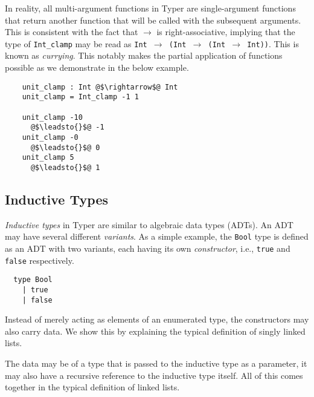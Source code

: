 \documentclass[12pt,twoside,maitrise]{dms}
\theoremstyle{definition}
\numberwithin{equation}{section}
\numberwithin{table}{chapter}
\numberwithin{figure}{chapter}
\newcommand\id[1] {\texttt{#1}}
\begin{document}
In reality, all multi-argument functions in Typer are single-argument functions
that return another function that will be called with the subsequent arguments.
This is consistent with the fact that \id{$\rightarrow$} is right-associative,
implying that the type of \id{Int_clamp} may be read as \id{Int $\rightarrow$
(Int $\rightarrow$ (Int $\rightarrow$ Int))}. This is known as \emph{currying}.
This notably makes the partial application of functions possible as we
demonstrate in the below example.

\begin{verbatim}
    unit_clamp : Int @$\rightarrow$@ Int
    unit_clamp = Int_clamp -1 1

    unit_clamp -10
      @$\leadsto{}$@ -1
    unit_clamp -0
      @$\leadsto{}$@ 0
    unit_clamp 5
      @$\leadsto{}$@ 1
\end{verbatim}

\subsection{Inductive Types}\label{subsec:intro-ind-types}


\emph{Inductive types} in Typer are similar to algebraic data types (ADTs). An
ADT may have several different \emph{variants}. As a simple example, the
\id{Bool} type is defined as an ADT with two variants, each having its own
\emph{constructor}, i.e., \id{true} and \id{false} respectively.

\begin{verbatim}
  type Bool
    | true
    | false
\end{verbatim}

Instead of merely acting as elements of an enumerated type, the constructors
may also carry data. We show this by explaining the typical definition of 
singly linked lists.

The data may be of a type that is passed to the inductive
type as a parameter, it may also have a recursive reference to the inductive
type itself. All of this comes together in the typical definition of linked
lists.
\end{document}

